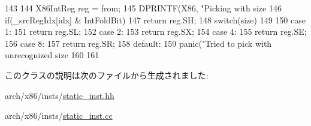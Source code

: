 \begin{DoxyCode}
143         {
144             X86IntReg reg = from;
145             DPRINTF(X86, "Picking with size %
146             if(_srcRegIdx[idx] & IntFoldBit)
147                 return reg.SH;
148             switch(size)
149             {
150               case 1:
151                 return reg.SL;
152               case 2:
153                 return reg.SX;
154               case 4:
155                 return reg.SE;
156               case 8:
157                 return reg.SR;
158               default:
159                 panic("Tried to pick with unrecognized size %
160             }
161         }
\end{DoxyCode}


このクラスの説明は次のファイルから生成されました:\begin{DoxyCompactItemize}
\item 
arch/x86/insts/\hyperlink{arch_2x86_2insts_2static__inst_8hh}{static\_\-inst.hh}\item 
arch/x86/insts/\hyperlink{arch_2x86_2insts_2static__inst_8cc}{static\_\-inst.cc}\end{DoxyCompactItemize}
